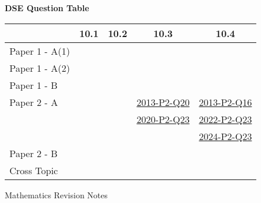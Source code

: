 \documentclass[12pt, a4paper]{article}
\begin{document}
\begin{absolutelynopagebreak}
\begin{center}
\textbf{DSE Question Table}
\end{center}
\begin{center}
\begin{tabular}{|l|c|c|c|c|}
\hline
        & 10.1 & 10.2 & 10.3 & 10.4 \\\hline
\hline
Paper 1 - A(1)&  &  &  &  \\
\hline
Paper 1 - A(2)&  &  &  &  \\
\hline
Paper 1 - B&  &  &  &  \\
\hline
\hline
Paper 2 - A&  &  & \hyperref[DSE2013-CoreP2-Q20]{2013-P2-Q20} & \hyperref[DSE2013-CoreP2-Q16]{2013-P2-Q16} \\
&  &  & \hyperref[DSE2020-CoreP2-Q23]{2020-P2-Q23} & \hyperref[DSE2022-CoreP2-Q23]{2022-P2-Q23} \\
&  &  &  & \hyperref[DSE2024-CoreP2-Q23]{2024-P2-Q23} \\
\hline
Paper 2 - B&  &  &  &  \\
\hline
\hline
Cross Topic&  &  &  &  \\
\hline
\end{tabular}
\end{center}
\end{absolutelynopagebreak}
\newpage
\newpage
\thispagestyle{empty}
\begin{center}
Mathematics Revision Notes\\\vspace{1cm}
\\\vspace{1cm}
{\fontsize{24pt}{24pt}\selectfont {Measures of Central Tendency}} \\\vspace{1cm}
\label{chapter:S3-11}

\end{center}
\vspace{0.5cm}
\hline
\end{document}
